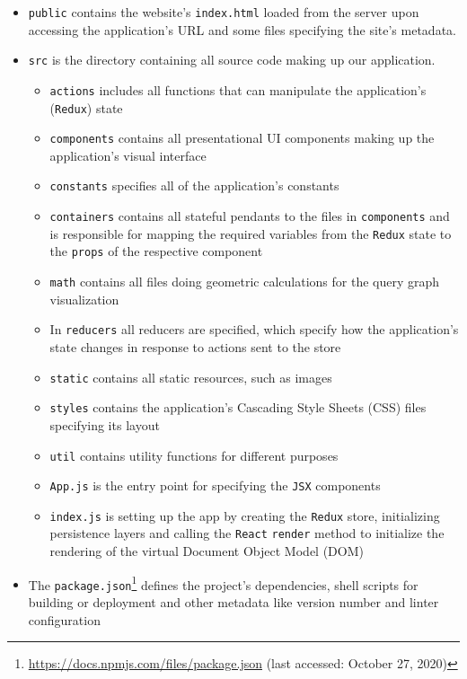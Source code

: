 \begin{itemize}
    \item \texttt{public} contains the website's \texttt{index.html} loaded from the server upon accessing the application's URL and some files specifying the site's metadata.
    \item \texttt{src} is the directory containing all source code making up our application.
    \begin{itemize}
        \item \texttt{actions} includes all functions that can manipulate the application's (\texttt{Redux}) state
        \item \texttt{components} contains all presentational UI components making up the application's visual interface
        \item \texttt{constants} specifies all of the application's constants
        \item \texttt{containers} contains all stateful pendants to the files in \texttt{components} and is responsible for mapping the required variables from the \texttt{Redux} state to the \texttt{props} of the respective component
        \item \texttt{math} contains all files doing geometric calculations for the query graph visualization
        \item In \texttt{reducers} all reducers are specified, which specify how the application's state changes in response to actions sent to the store
        \item \texttt{static} contains all static resources, such as images
        \item \texttt{styles} contains the application's Cascading Style Sheets (CSS) files specifying its layout
        \item \texttt{util} contains utility functions for different purposes
        \item \texttt{App.js} is the entry point for specifying the \texttt{JSX} components
        \item \texttt{index.js} is setting up the app by creating the \texttt{Redux} store, initializing persistence layers and calling the \texttt{React} \texttt{render} method to initialize the rendering of the virtual Document Object Model (DOM)
    \end{itemize}
    \item The \texttt{package.json}\footnote{\url{https://docs.npmjs.com/files/package.json} (last accessed: October 27, 2020)} defines the project's dependencies, shell scripts for building or deployment and other metadata like version number and linter configuration
\end{itemize}

